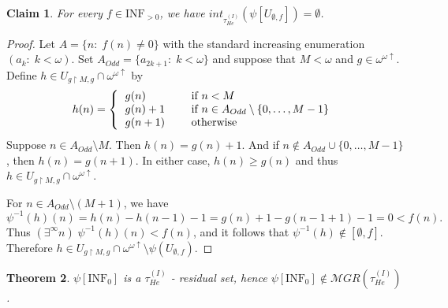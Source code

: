 \documentclass[12pt]{amsart}
\theoremstyle{plain}
\newtheorem{theorem}{Theorem}[section]
\newtheorem{claim}[theorem]{Claim}
\theoremstyle{definition}
\theoremstyle{remark}
\newcommand{\incrbaire}{\omega^{\omega \uparrow}}
\newcommand{\inversepsi}{\psi^{-1}}
\newcommand{\meager}{{\mathcal MGR}}
\newcommand{\oo}{\omega}
\newcommand{\Hechler}[2]{U_{#1,#2}}
\newcommand{\HechlerInduced}{\tau_{\mathit{He}}^{(I)}}
\newcommand{\INFZero}{\mathrm{INF}_0}
\newcommand{\INFNonZero}{\mathrm{INF}_{>0}}
\begin{document}
\begin{claim}
\label{claim:about-not-terminate-in-0}
For every $f\in \INFNonZero$,
we have $\mathit{int}_{\HechlerInduced}(\psi[\Hechler{\emptyset}{f}]) = \emptyset$.
\end{claim}
\begin{proof}
Let $A= \{n:\;f(n) \not=0\}$ with the standard increasing enumeration
$(a_k:\;k<\oo)$.
Set $A_{Odd} = \{a_{2k+1}:\;k<\oo\}$ and
suppose that $M<\oo$ and $g\in\incrbaire$.
Define $h\in \Hechler{g\restriction M}{g} \cap \incrbaire$ by 
\[
h(n) = \left\{ 
	\begin{tabular}{lll}
	$g(n)$ && if $n < M$\\
	$g(n) + 1$  && if $n \in A_{Odd} \setminus \lbrace 0, \ldots, M-1\rbrace$\\
	$g(n+1)$ && otherwise
	\end{tabular}
	\right.
\]
Suppose $n\in A_{Odd} \setminus M$. Then 
$h(n) = g(n) + 1$. And if $n \notin A_{Odd}\cup \lbrace 0, \ldots, M-1\rbrace$,
then $h(n) = g(n+1)$.
In either case, $h(n) \ge g(n)$
and thus $h\in \Hechler{g\restriction M}{g} \cap \incrbaire$.

For $n\in A_{Odd} \setminus (M+1)$,
we have 
$$
\inversepsi(h)(n) = h(n) - h(n-1) - 1 = g(n) + 1 - g(n-1+1) - 1 = 0 < f(n).
$$
Thus $(\exists^\infty n)\;\inversepsi(h)(n) < f(n)$,
and it follows that $\inversepsi(h)\notin [\emptyset,f]$.
Therefore $h \in \Hechler{g\restriction M}{g} \cap \incrbaire \setminus \psi(\Hechler{\emptyset}{f})$.
\end{proof}

\begin{theorem}\label{theorem:psiinfzero-residual}
  $\psi[\INFZero]$ is a $\HechlerInduced$ - residual set, hence
  $\psi[\INFZero] \not\in \meager(\HechlerInduced)$.
\end{theorem}
\end{document}
